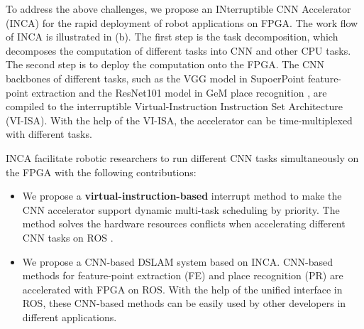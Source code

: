 To address the above challenges, we propose an INterruptible CNN Accelerator (INCA) for the rapid deployment of robot applications on FPGA.
The work flow of INCA is illustrated in (b). 
The first step is the task decomposition, which decomposes the computation of different tasks into CNN and other CPU tasks.
The second step is to deploy the computation onto the FPGA. 
The CNN backbones of different tasks, such as the VGG model \cite{kim2016accurate} in SupoerPoint feature-point extraction \cite{detone2018superpoint} and the ResNet101 model \cite{he2016deep} in GeM place recognition \cite{radenovic2018fine}, are compiled to the interruptible Virtual-Instruction Instruction Set Architecture (VI-ISA). With the help of the VI-ISA, the accelerator can be time-multiplexed with different tasks.




INCA facilitate robotic researchers to run different CNN tasks simultaneously on the FPGA with the following contributions:
\begin{itemize}
\item We propose a \textbf{virtual-instruction-based} interrupt method to make the CNN accelerator support dynamic multi-task scheduling by priority. The method solves the hardware resources conflicts when accelerating different CNN tasks on ROS \cite{quigley2009ros}.
\item We propose a CNN-based DSLAM system based on INCA. CNN-based methods for feature-point extraction (FE) and place recognition (PR) are accelerated with FPGA on ROS. With the help of the unified interface in ROS, these CNN-based methods can be easily used by other developers in different applications.
\end{itemize}

